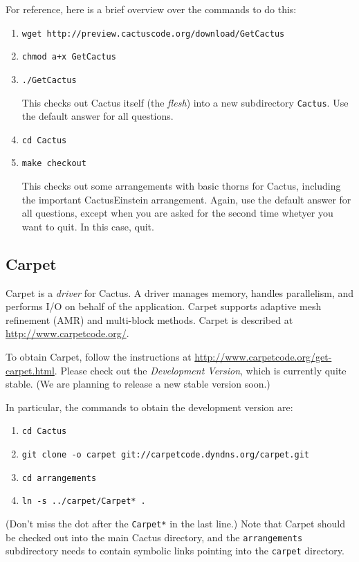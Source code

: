 \documentclass[11pt, tightenlines]{revtex4}
\newcommand{\code}[1]{\texttt{#1}}
\begin{document}
For reference, here is a brief overview over the commands to do this:
\begin{enumerate}
\item\verb+wget http://preview.cactuscode.org/download/GetCactus+
\item\verb-chmod a+x GetCactus-
\item\verb+./GetCactus+
  
  This checks out Cactus itself (the \emph{flesh}) into a new
  subdirectory \code{Cactus}.  Use the default answer for all
  questions.
\item\verb+cd Cactus+
\item\verb+make checkout+
  
  This checks out some arrangements with basic thorns for Cactus,
  including the important CactusEinstein arrangement.  Again, use the
  default answer for all questions, except when you are asked for the
  second time whetyer you want to quit.  In this case, quit.
\end{enumerate}

\subsection{Carpet}

Carpet \cite{ES-Schnetter2003b, ES-Schnetter2006a, ES-carpetweb} is a
\emph{driver} for Cactus.  A driver manages memory, handles
parallelism, and performs I/O on behalf of the application.  Carpet
supports adaptive mesh refinement (AMR) and multi-block methods.
Carpet is described at \url{http://www.carpetcode.org/}.

To obtain Carpet, follow the instructions at
\url{http://www.carpetcode.org/get-carpet.html}.  Please check out the
\emph{Development Version}, which is currently quite stable.  (We are
planning to release a new stable version soon.)

In particular, the commands to obtain the development version are:
\begin{enumerate}
\item\verb+cd Cactus+
\item\verb+git clone -o carpet git://carpetcode.dyndns.org/carpet.git+
\item\verb+cd arrangements+
\item\verb+ln -s ../carpet/Carpet* .+
\end{enumerate}
(Don't miss the dot after the \verb+Carpet*+ in the last line.)  Note
that Carpet should be checked out into the main Cactus directory, and
the \code{arrangements} subdirectory needs to contain symbolic links
pointing into the \code{carpet} directory.
\end{document}
